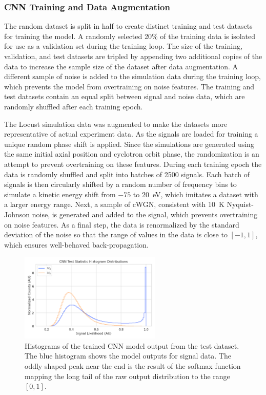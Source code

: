 \subsubsection{CNN Training and Data Augmentation}
The random dataset is split in half to create distinct training and test datasets for training the model. A randomly selected 20\% of the training data is isolated for use as a validation set during the training loop. The size of the training, validation, and test datasets are tripled by appending two additional copies of the data to increase the sample size of the dataset after data augmentation. A different sample of noise is added to the simulation data during the training loop, which prevents the model from overtraining on noise features. The training and test datasets contain an equal split between signal and noise data, which are randomly shuffled after each training epoch.

The Locust simulation data was augmented to make the datasets more representative of actual experiment data. As the signals are loaded for training a unique random phase shift is applied. Since the simulations are generated using the same initial axial position and cyclotron orbit phase, the randomization is an attempt to prevent overtraining on these features. During each training epoch the data is randomly shuffled and split into batches of 2500 signals. Each batch of signals is then circularly shifted by a random number of frequency bins to simulate a kinetic energy shift from $-75$ to $20$~eV, which imitates a dataset with a larger energy range. Next, a sample of cWGN, consistent with 10~K Nyquist-Johnson noise, is generated and added to the signal, which prevents overtraining on noise features. As a final step, the data is renormalized by the standard deviation of the noise so that the range of values in the data is close to $[-1,1]$, which ensures well-behaved back-propagation.

\begin{figure}[htbp]
    \centering
    \includegraphics[width=0.6\textwidth]{figs/Chapter-4/230324_cnn_test_stat_hist.png}
    \caption{Histograms of the trained CNN model output from the test dataset. The blue histogram shows the model outputs for signal data. The oddly shaped peak near the end is the result of the softmax function mapping the long tail of the raw output distribution to the range $[0,1]$. }
    \label{fig:cnn_histogram}
\end{figure}

